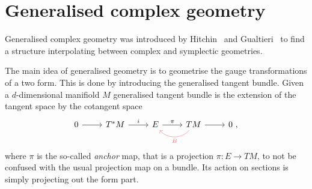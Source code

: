 \documentclass[debug]{phd}
\begin{document}
		\section{Generalised complex geometry}
				Generalised complex geometry was introduced by Hitchin~\cite{hitch1} and Gualtieri~\cite{gualtphd} to find a structure interpolating between complex and symplectic geometries.
				
					The main idea of generalised geometry is to geometrise the gauge transformations of a two form. 
					This is done by introducing the generalised tangent bundle. 
					Given a $d$-dimensional manifiold $M$ generalised tangent bundle is the extension of the tangent space by the cotangent space
							\begin{equation}\label{gentanext}
								\begin{tikzcd}
									0 \arrow{r} &T^*M \arrow{r}{i} & E \arrow{r}{\pi}& TM \arrow[bend left=50, color = red!60]{l}{B} \arrow{r}& 0 \ ,
								\end{tikzcd}
							\end{equation}
					where $\pi$ is the so-called \emph{anchor} map, that is a projection $\pi: E \rightarrow TM$, to not be confused with the usual projection map on a bundle.
					Its action on sections is simply projecting out the form part.
					
\end{document}
